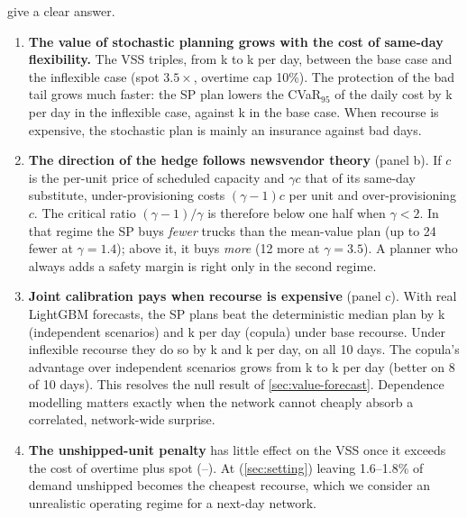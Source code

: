  give a clear answer.
\begin{enumerate}
  \item \textbf{The value of stochastic planning grows with the cost of same-day flexibility.} The VSS triples, from k to k per day, between the base case and the inflexible case (spot $3.5\times$, overtime cap 10\%). The protection of the bad tail grows much faster: the SP plan lowers the CVaR$_{95}$ of the daily cost by k per day in the inflexible case, against k in the base case. When recourse is expensive, the stochastic plan is mainly an insurance against bad days.
  \item \textbf{The direction of the hedge follows newsvendor theory} (panel b). If $c$ is the per-unit price of scheduled capacity and $\gamma c$ that of its same-day substitute, under-provisioning costs $(\gamma-1)c$ per unit and over-provisioning $c$. The critical ratio $(\gamma-1)/\gamma$ is therefore below one half when $\gamma<2$. In that regime the SP buys \emph{fewer} trucks than the mean-value plan (up to 24 fewer at $\gamma=1.4$); above it, it buys \emph{more} (12 more at $\gamma=3.5$). A planner who always adds a safety margin is right only in the second regime.
  \item \textbf{Joint calibration pays when recourse is expensive} (panel c). With real LightGBM forecasts, the SP plans beat the deterministic median plan by k (independent scenarios) and k per day (copula) under base recourse. Under inflexible recourse they do so by k and k per day, on all 10 days. The copula's advantage over independent scenarios grows from k to k per day (better on 8 of 10 days). This resolves the null result of \cref{sec:value-forecast}. Dependence modelling matters exactly when the network cannot cheaply absorb a correlated, network-wide surprise.
  \item \textbf{The unshipped-unit penalty} has little effect on the VSS once it exceeds the cost of overtime plus spot (--). At  (\cref{sec:setting}) leaving 1.6--1.8\% of demand unshipped becomes the cheapest recourse, which we consider an unrealistic operating regime for a next-day network.
\end{enumerate}
